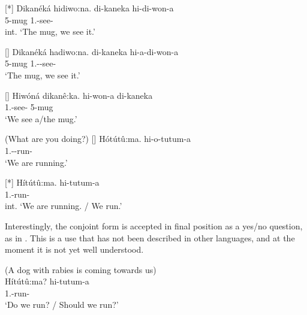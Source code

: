 \documentclass[output=paper]{langscibook}
\begin{document}
\ea
\label{bkm:Ref120705766}
\ea
[*]{
\label{bkm:Ref120705766:a}
{Dikanéká hidiwo:na.}\jambox*{[conjoint]}
\gll
di-kaneka  hi-di-won-a\\
5-mug  1\PL.\OM-see-\FV\\
\glt
int. ‘The mug, we see it.’\\
}


\ex
[]{
\label{bkm:Ref120705766:b}
{Dikanéká hadiwo:na.}\jambox*{[disjoint]}
\gll
di-kaneka  hi-a-di-won-a\\
5-mug  1\PL.\SM-\OM-see-\FV\\
\glt
‘The mug, we see it.’\\
}


\ex
[]{
\label{bkm:Ref120705766:c}
{Hiwóná dikanê:ka.}\jambox*{[conjoint]}
\gll
hi-won-a  di-kaneka \\
1\PL.\SM-see-\FV{}  5-mug \\
\glt
‘We see a/the mug.’\\
}

\z
\z

\ea
\label{bkm:Ref120705751}
(What are you doing?)
\ea
[]{
\label{bkm:Ref120705751:a}
{Hótútû:ma.}\jambox*{[progressive]}
\gll
hi-o-tutum-a\\
1\PL.\SM-\PROG-run-\FV\\
\glt
‘We are running.’\\
}


\ex
[*]{
\label{bkm:Ref120705751:b}
{Hítútû:ma.}\jambox*{[conjoint]}
\gll
hi-tutum-a\\
1\PL.\SM-run-\FV\\
\glt
int. ‘We are running. / We run.’\\
}

\z
\z

Interestingly, the conjoint form is accepted in final position as a yes/no question, as in . This is a use that has not been described in other languages, and at the moment it is not yet well understood.

\ea
\label{bkm:Ref120705945}
(A dog with rabies is coming towards us)\\
{Hítútû:ma?}\jambox*{[conjoint]}
\gll
hi-tutum-a\\
1\PL.\SM-run-\FV\\
\glt ‘Do we run? / Should we run?’
\end{document}
